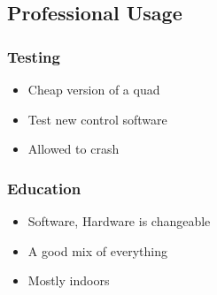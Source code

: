 \subsection{Professional Usage}



\begin{frame}
\frametitle{Testing}

  \begin{itemize}
  	\item Cheap version of a quad 
    \item Test new control software
    \item Allowed to crash  
  \end{itemize}
  
\end{frame}



\begin{frame}
\frametitle{Education}

  \begin{itemize}
  	\item Software, Hardware is changeable
  	\item A good mix of everything
  	\item Mostly indoors
  \end{itemize}
  
\end{frame}

